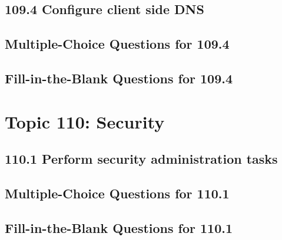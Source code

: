 \documentclass[a4paper]{report}
\begin{document}
\section*{109.4 Configure client side DNS}

\newpage
\section*{Multiple-Choice Questions for 109.4}

\newpage
\section*{Fill-in-the-Blank Questions for 109.4}

\newpage
\chapter{Topic 110: Security}

\newpage
\section*{110.1 Perform security administration tasks}

\newpage
\section*{Multiple-Choice Questions for 110.1}

\newpage
\section*{Fill-in-the-Blank Questions for 110.1}
\end{document}
